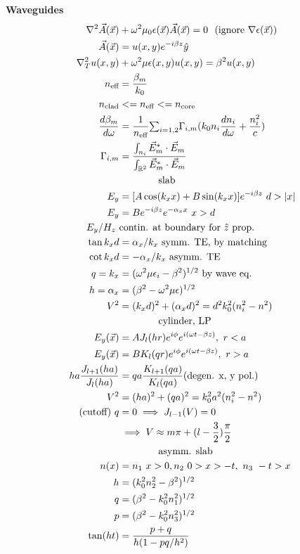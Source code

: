 \documentclass[12pt]{article}
\begin{document}
\begin{multicols}{2}
\textbf{Waveguides}
\begin{align}
\nabla^2 \vec{A}(\vec{x}) &+ \omega^2 \mu_0 \epsilon(\vec{x}) \vec{A}(\vec{x}) = 0 \ \ (\textrm{ignore} \ \nabla\epsilon(\vec{x}))\\
\vec{A}(\vec{x}) &= u(x, y) e^{-i \beta z} \hat{y}\\
\nabla^2_T u(x, y) &+ \omega^2 \mu \epsilon(x, y) u(x, y) = \beta^2 u(x, y)\\
n_{\textrm{eff}} &= \frac{\beta_m}{k_0}\\
n_{\textrm{clad}} &<= n_{\textrm{eff}} <= n_{\textrm{core}}\\
\frac{d\beta_m}{d\omega} &= \frac{1}{n_{\textrm{eff}}} {\textstyle \sum_{i = 1, 2}} \Gamma_{i,m} (k_0 n_i \frac{dn_i}{d\omega} + \frac{n_i^2}{c})\\
\Gamma_{i,m} &= \frac{\int_{n_i} \vec{E}_{m}^* \cdot \vec{E}_{m}}{\int_{\mathbb{R}^2} \vec{E}_{m}^* \cdot \vec{E}_{m}}\\
& \qquad \qquad \textrm{slab}\\
E_{y} &= [A \cos(k_x x) + B \sin(k_x x)]e^{-i\beta z} \ d > \abs{x}\\
E_{y} &= B e^{-i \beta z} e^{- \alpha_x x} \ x > d\\
E_{y} / H_{z} \ &\textrm{contin. at boundary for} \ \hat{z} \ \textrm{prop.}\\
\tan{k_x d} &= \alpha_x / k_x \ \textrm{symm. TE, by matching}\\
\cot{k_x d} &= - \alpha_x / k_x \ \textrm{asymm. TE}\\
q = k_x &= (\omega^2 \mu \epsilon_i - \beta^2)^{1/2} \ \textrm{by wave eq.}\\
h = \alpha_x &= (\beta^2 - \omega^2 \mu \epsilon)^{1/2}\\
V^2 &= (k_x d)^2 + (\alpha_x d)^2 = d^2 k_0^2 (n_i^2 - n^2)\\
& \qquad \qquad \textrm{cylinder, LP}\\
E_y(\vec{x}) &= AJ_l(hr)e^{i\phi}e^{i(\omega t - \beta z)}, \ r < a\\
E_y(\vec{x}) &= BK_l(qr)e^{i\phi}e^{i(\omega t - \beta z)}, \ r > a\\
ha \frac{J_{l + 1}(ha)}{J_{l}(ha)} &= qa \frac{K_{l + 1}(qa)}{K_l(qa)} (\textrm{degen. x, y pol.})\\
V^2 &= (ha)^2 + (qa)^2 = k_0^2 a^2 (n_i^2 - n^2)\\
\textrm{(cutoff)} \ q &= 0 \implies J_{l - 1}(V) = 0\\
&\implies V \approx m\pi + (l - \frac{3}{2})\frac{\pi}{2}\\
& \qquad \qquad \textrm{asymm. slab}\\
n(x) &= n_1 \ x > 0, n_2 \ 0 > x > -t, \ n_3 \ -t > x\\
h &= (k_0^2 n_2^2 - \beta^2)^{1/2}\\
q &= (\beta^2 - k_0^2 n_1^2)^{1/2}\\
p &= (\beta^2 - k_0^2 n_3^2)^{1/2}\\
\tan(ht) &= \frac{p + q}{h(1 - pq/h^2)}
\end{align}


\end{multicols}
\end{document}
